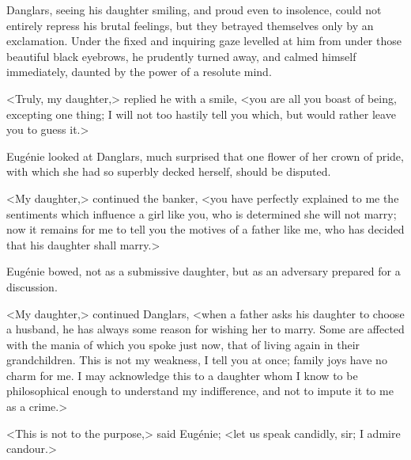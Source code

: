  Danglars, seeing his daughter smiling, and proud even to insolence, could not entirely repress his brutal feelings, but they betrayed themselves only by an exclamation. Under the fixed and inquiring gaze levelled at him from under those beautiful black eyebrows, he prudently turned away, and calmed himself immediately, daunted by the power of a resolute mind. 

 <Truly, my daughter,> replied he with a smile, <you are all you boast of being, excepting one thing; I will not too hastily tell you which, but would rather leave you to guess it.> 

 Eugénie looked at Danglars, much surprised that one flower of her crown of pride, with which she had so superbly decked herself, should be disputed. 

 <My daughter,> continued the banker, <you have perfectly explained to me the sentiments which influence a girl like you, who is determined she will not marry; now it remains for me to tell you the motives of a father like me, who has decided that his daughter shall marry.> 

 Eugénie bowed, not as a submissive daughter, but as an adversary prepared for a discussion. 

 <My daughter,> continued Danglars, <when a father asks his daughter to choose a husband, he has always some reason for wishing her to marry. Some are affected with the mania of which you spoke just now, that of living again in their grandchildren. This is not my weakness, I tell you at once; family joys have no charm for me. I may acknowledge this to a daughter whom I know to be philosophical enough to understand my indifference, and not to impute it to me as a crime.> 

 <This is not to the purpose,> said Eugénie; <let us speak candidly, sir; I admire candour.> 

